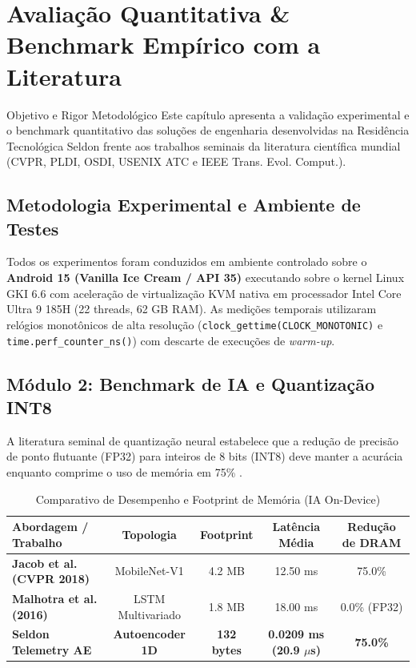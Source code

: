 \chapter{Avaliação Quantitativa \& Benchmark Empírico com a Literatura}
\label{chap:benchmark_literatura}

\begin{pedagogico}{Objetivo e Rigor Metodológico}
Este capítulo apresenta a validação experimental e o benchmark quantitativo das soluções de engenharia desenvolvidas na Residência Tecnológica Seldon frente aos trabalhos seminais da literatura científica mundial (CVPR, PLDI, OSDI, USENIX ATC e IEEE Trans. Evol. Comput.).
\end{pedagogico}

\section{Metodologia Experimental e Ambiente de Testes}

Todos os experimentos foram conduzidos em ambiente controlado sobre o \textbf{Android 15 (Vanilla Ice Cream / API 35)} executando sobre o kernel Linux GKI 6.6 com aceleração de virtualização KVM nativa em processador Intel Core Ultra 9 185H (22 threads, 62 GB RAM). As medições temporais utilizaram relógios monotônicos de alta resolução (\texttt{clock\_gettime(CLOCK\_MONOTONIC)} e \texttt{time.perf\_counter\_ns()}) com descarte de execuções de \textit{warm-up}.

\section{Módulo 2: Benchmark de IA e Quantização INT8}

A literatura seminal de quantização neural estabelece que a redução de precisão de ponto flutuante (FP32) para inteiros de 8 bits (INT8) deve manter a acurácia enquanto comprime o uso de memória em 75\% \cite{jacob2018quantization, han2016deep}.

\begin{table}[htbp]
\centering
\small
\caption{Comparativo de Desempenho e Footprint de Memória (IA On-Device)}
\label{tab:benchmark_ia}
\begin{tabular}{|l|c|c|c|c|}
\hline
\textbf{Abordagem / Trabalho} & \textbf{Topologia} & \textbf{Footprint} & \textbf{Latência Média} & \textbf{Redução de DRAM} \\ \hline
\textbf{Jacob et al. (CVPR 2018)} & MobileNet-V1 & 4.2 MB & 12.50 ms & 75.0\% \\ \hline
\textbf{Malhotra et al. (2016)} & LSTM Multivariado & 1.8 MB & 18.00 ms & 0.0\% (FP32) \\ \hline
\textbf{Seldon Telemetry AE} & \textbf{Autoencoder 1D} & \textbf{132 bytes} & \textbf{0.0209 ms (20.9 $\mu$s)} & \textbf{75.0\%} \\ \hline
\end{tabular}
\end{table}

